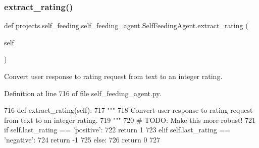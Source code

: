 \mbox{\label{classprojects_1_1self__feeding_1_1self__feeding__agent_1_1SelfFeedingAgent_a9c1c1e9435e1b56420fee71a31c5d57e}} 
\subsubsection{\texorpdfstring{extract\+\_\+rating()}{extract\_rating()}}
{\footnotesize\ttfamily def projects.\+self\+\_\+feeding.\+self\+\_\+feeding\+\_\+agent.\+Self\+Feeding\+Agent.\+extract\+\_\+rating (\begin{DoxyParamCaption}\item[{}]{self }\end{DoxyParamCaption})}

\begin{DoxyVerb}Convert user response to rating request from text to an integer rating.
\end{DoxyVerb}
 

Definition at line 716 of file self\+\_\+feeding\+\_\+agent.\+py.


\begin{DoxyCode}
716     \textcolor{keyword}{def }extract\_rating(self):
717         \textcolor{stringliteral}{"""}
718 \textcolor{stringliteral}{        Convert user response to rating request from text to an integer rating.}
719 \textcolor{stringliteral}{        """}
720         \textcolor{comment}{# TODO: Make this more robust!}
721         \textcolor{keywordflow}{if} self.last\_rating == \textcolor{stringliteral}{'positive'}:
722             \textcolor{keywordflow}{return} 1
723         \textcolor{keywordflow}{elif} self.last\_rating == \textcolor{stringliteral}{'negative'}:
724             \textcolor{keywordflow}{return} -1
725         \textcolor{keywordflow}{else}:
726             \textcolor{keywordflow}{return} 0
727 
\end{DoxyCode}
\mbox{\label{classprojects_1_1self__feeding_1_1self__feeding__agent_1_1SelfFeedingAgent_ae98cf6c1345c3cff3278339ef1c855a4}} 
